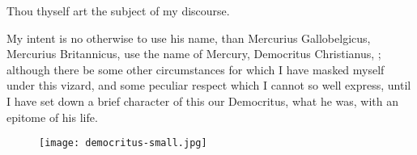 Thou thyself art the subject of my discourse.


My intent is no otherwise to use his name, than Mercurius Gallobelgicus,
Mercurius Britannicus, use the name of Mercury, Democritus
Christianus, \etc{}; although there be some other circumstances for which I
have masked myself under this vizard, and some peculiar respect which I cannot
so well express, until I have set down a brief character of this our
Democritus, what he was, with an epitome of his life.

\begin{figure}[H]
  \begingroup
  \centering
  \texttt{[image: democritus-small.jpg]}
  \label{fig:democritus}
\end{figure}

